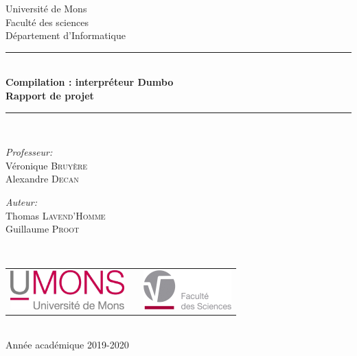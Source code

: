 \documentclass[a4paper, 12pt]{article}
\begin{document}
\begin{titlepage}
\begin{center}

{\Large Université de Mons}\\[1ex]
{\Large Faculté des sciences}\\[1ex]
{\Large Département d'Informatique}\\[2.5cm]

\newcommand{\HRule}{\rule{\linewidth}{0.3mm}}
\HRule \\[0.3cm]
{ \LARGE \bfseries Compilation : interpréteur Dumbo \\[0.3cm]}
{ \LARGE \bfseries Rapport de projet \\[0.1cm]} %
\HRule \\[1.5cm]

\begin{minipage}[t]{0.45\textwidth}
\begin{flushleft} \large
\emph{Professeur:}\\
Véronique \textsc{Bruyère}\\
Alexandre \textsc{Decan}
\end{flushleft}
\end{minipage}
\begin{minipage}[t]{0.45\textwidth}
\begin{flushright} \large
\emph{Auteur:} \\
Thomas \textsc{Lavend'Homme}\\
Guillaume \textsc{Proot}
\end{flushright}
\end{minipage}\\[2ex]

\vfill

\begin{center}
\begin{tabular}[t]{c c c}
\includegraphics[height=1.5cm]{logoumons.jpg} &
\hspace{0.3cm} &
\includegraphics[height=1.5cm]{logofs.jpg}
\end{tabular}
\end{center}~\\
 
{\large Année académique 2019-2020}

\end{center}
\end{titlepage}
\end{document}
